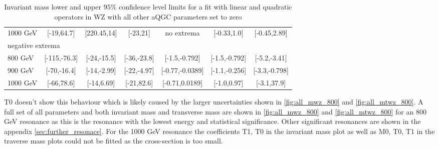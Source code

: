 \documentclass[../Bachelorarbeit.tex]{subfiles}
\begin{document}
\begin{table}[h]
\begin{tabular}{ l c c c c c c }
        1000 GeV & [-19,64.7]   & [220.45,14]   & [-23,21]     & no extrema      & [-0.33,1.0]   & [-0.45,2.89]  \\
        \multicolumn{7}{l}{ negative extrema }                                                                   \\
        800 GeV  & [-115,-76.3] & [-24,-15.5]   & [-36,-23.8]  & [-1.5,-0.792]   & [-1.5,-0.792] & [-5.2,-3.41]  \\
        900 GeV  & [-70,-16.4]  & [-14,-2.99]   & [-22,-4.97]  & [-0.77,-0.0389] & [-1.1,-0.256] & [-3.3,-0.798] \\
        1000 GeV & [-66,78.6]   & [-14,6.69]    & [-21,82.6]   & [-0.71,0.0189]  & [-1.0,0.97]   & [-3.1,37.9]   \\
        \hline
    \end{tabular}

    \caption{Invariant mass lower and upper $95\%$ confidence level limits for a fit with linear and quadratic operators in WZ with all other aQGC parameters set to zero}
    \label{tab:inv_mass_EFT_limits}

\end{table}
T0 doesn't show this behaviour which is likely caused by the larger uncertainties shown in \ref{fig:all_mwz_800} and \ref{fig:all_mtwz_800}.
A full set of all parameters and both invariant mass and transverse mass are shown in \ref{fig:all_mwz_800} and \ref{fig:all_mtwz_800} for an 800 GeV resonance as this is the resonance with the lowest energy and statistical significance. Other significant resonances are shown in the appendix \ref{sec:further_resonace}.
For the 1000 GeV resonance the coefficients T1, T0 in the invariant mass plot as well as M0, T0, T1 in the traverse mass plots could not be fitted as the cross-section is too small.
\end{document}
